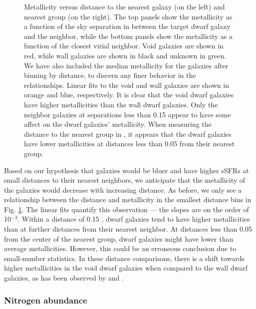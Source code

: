 \begin{figure}
    \caption[Metallicity versus distance to nearest neighbor and group]
    {Metallicity versus distance to the nearest galaxy (on the left) and nearest 
    group (on the right).  The top panels show the metallicity as a function of 
    the sky separation in \hMpc between the target dwarf galaxy and the 
    neighbor, while the bottom panels show the metallicity as a function of the 
    closest virial neighbor.  Void galaxies are shown in red, while wall 
    galaxies are shown in black and unknown in green.  We have also included the 
    median metallicity for the galaxies after binning by distance, to discern 
    any finer behavior in the relationships.  Linear fits to the void and wall 
    galaxies are shown in orange and blue, respectively.  It is clear that the 
    void dwarf galaxies have higher metallicities than the wall dwarf galaxies.  
    Only the neighbor galaxies at separations less than 0.15 \hMpc appear to 
    have some affect on the dwarf galaxies' metallicity.  When measuring the 
    distance to the nearest group in \hMpc, it appears that the dwarf galaxies 
    have lower metallicities at distances less than 0.05 \hMpc from their 
    nearest group.}
    \label{fig:OH}
\end{figure}

Based on our hypothesis that galaxies would be bluer and have higher sSFRs at 
small distances to their nearest neighbors, we anticipate that the metallicity 
of the galaxies would decrease with increasing distance.  As before, we only see 
a relationship between the distance and metallicity in the smallest distance 
bins in Fig. \ref{fig:OH}.  The linear fits quantify this observation --- the 
slopes are on the order of 10$^{-3}$.  Within a distance of 0.15 \hMpc, dwarf 
galaxies tend to have higher metallicities than at further distances from their 
nearest neighbor.  At distances less than 0.05 \hMpc from the center of the 
nearest group, dwarf galaxies might have lower than average metallicities.  
However, this could be an erroneous conclusion due to small-number statistics.  
In these distance comparisons, there is a shift towards higher metallicities in 
the void dwarf galaxies when compared to the wall dwarf galaxies, as has been 
observed by \cite{Douglass17b} and \cite{Douglass17c}.  


\subsubsection{Nitrogen abundance}

